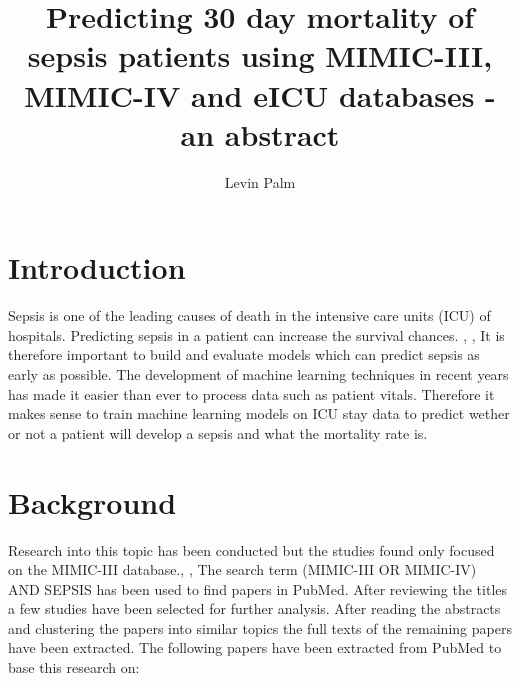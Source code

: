 \documentclass[
	a4paper,
	pagesize,
	pdftex,
	12pt,
	ngerman,
	fleqn,
	final,
	]{scrartcl}
\begin{document}
	\title{Predicting 30 day mortality of sepsis patients using MIMIC-III, MIMIC-IV and eICU databases - an abstract}

	\author{Levin Palm}

	\maketitle


	\section{Introduction}

		Sepsis is one of the leading causes of death in the intensive care units (ICU) of hospitals. 
		Predicting sepsis in a patient can increase the survival chances. \cite{paper1}, \cite{paper2}, \cite{paper3}
		It is therefore important to build and evaluate models which can predict sepsis as early as possible. 
		The development of machine learning techniques in recent years has made it easier than ever to process data such as patient vitals. 
		Therefore it makes sense to train machine learning models on ICU stay data to predict wether or not a patient will develop a sepsis and what the mortality rate is.

	\section{Background}

		Research into this topic has been conducted but the studies found only focused on the MIMIC-III database.\cite{paper1}, \cite{paper2}, \cite{paper3}
		The search term (MIMIC-III OR MIMIC-IV) AND SEPSIS has been used to find
		papers in PubMed. After reviewing the titles a few studies have been selected for further analysis. After reading the abstracts and 
		clustering the papers into similar topics the full texts of the remaining papers have been extracted. The following
		papers have been extracted from PubMed to base this research on:
\end{document}
